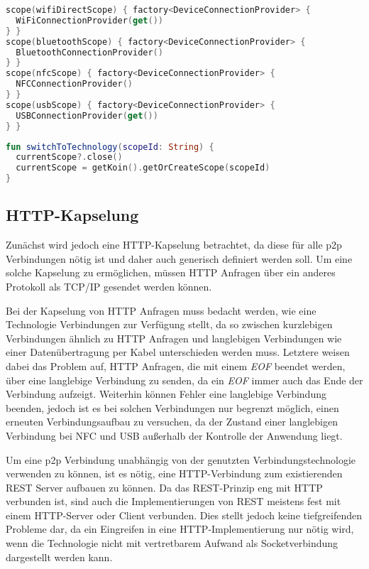         \begin{lstlisting}[frame=bt, label={lst:android:koin}, language=Kotlin, caption=Auswechselbarkeit durch Dependency Injection (Clientcode in Kotlin)]
scope(wifiDirectScope) { factory<DeviceConnectionProvider> {
  WiFiConnectionProvider(get())
} }
scope(bluetoothScope) { factory<DeviceConnectionProvider> {
  BluetoothConnectionProvider()
} }
scope(nfcScope) { factory<DeviceConnectionProvider> {
  NFCConnectionProvider()
} }
scope(usbScope) { factory<DeviceConnectionProvider> {
  USBConnectionProvider(get())
} }  
        \end{lstlisting}
        
        \begin{lstlisting}[frame=bt, label={lst:android:scope}, language=Kotlin, caption=Auswechselbarkeit durch Dependency Injection (Clientcode in Kotlin)]
fun switchToTechnology(scopeId: String) {
  currentScope?.close()
  currentScope = getKoin().getOrCreateScope(scopeId)
}
        \end{lstlisting}
        
    \subsection{HTTP-Kapselung}
        Zunächst wird jedoch eine HTTP-Kapselung betrachtet, da diese für alle p2p Verbindungen nötig ist und daher auch generisch definiert werden soll. Um eine solche Kapselung zu ermöglichen, müssen HTTP Anfragen über ein anderes Protokoll als TCP/IP gesendet werden können.
        
        Bei der Kapselung von HTTP Anfragen muss bedacht werden, wie eine Technologie Verbindungen zur Verfügung stellt, da so zwischen kurzlebigen Verbindungen ähnlich zu HTTP Anfragen und langlebigen Verbindungen wie einer Datenübertragung per Kabel unterschieden werden muss. Letztere weisen dabei das Problem auf, HTTP Anfragen, die mit einem {\it EOF} beendet werden, über eine langlebige Verbindung zu senden, da ein {\it EOF} immer auch das Ende der Verbindung aufzeigt. Weiterhin können Fehler eine langlebige Verbindung beenden, jedoch ist es bei solchen Verbindungen nur begrenzt möglich, einen erneuten Verbindungsaufbau zu versuchen, da der Zustand einer langlebigen Verbindung bei NFC und USB außerhalb der Kontrolle der Anwendung liegt.
    
        Um eine p2p Verbindung unabhängig von der genutzten Verbindungstechnologie verwenden zu können, ist es nötig, eine HTTP-Verbindung zum existierenden REST Server aufbauen zu können. Da das REST-Prinzip eng mit HTTP verbunden ist, sind auch die Implementierungen von REST meistens fest mit einem HTTP-Server oder Client verbunden. Dies stellt jedoch keine tiefgreifenden Probleme dar, da ein Eingreifen in eine HTTP-Implementierung nur nötig wird, wenn die Technologie nicht mit vertretbarem Aufwand als Socketverbindung dargestellt werden kann.
        
